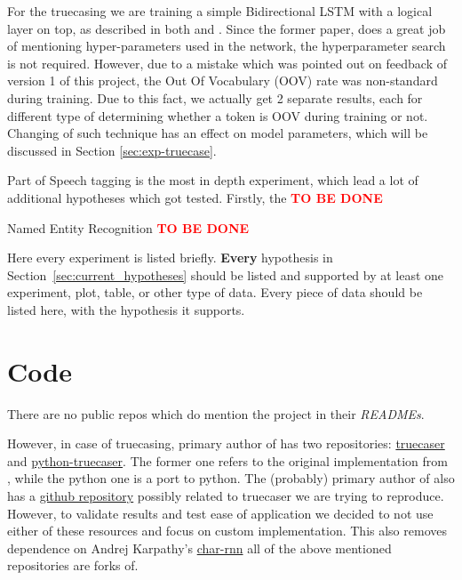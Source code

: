 \documentclass[11pt,a4paper]{article}
\begin{document}
For the truecasing we are training a simple Bidirectional LSTM with a logical layer on top, as described in both \cite{ner-and-pos-original} and \cite{susanto-etal-2016-learning}. Since the former paper, does a great job of mentioning hyper-parameters used in the network, the hyperparameter search is not required. However, due to a mistake which was pointed out on feedback of version 1 of this project, the Out Of Vocabulary (OOV) rate was non-standard during training. Due to this fact, we actually get 2 separate results, each for different type of determining whether a token is OOV during training or not. Changing of such technique has an effect on model parameters, which will be discussed in Section \ref{sec:exp-truecase}.

Part of Speech tagging is the most in depth experiment, which lead a lot of additional hypotheses which got tested. Firstly, the \textbf{\textcolor{red}{TO BE DONE}}

Named Entity Recognition \textbf{\textcolor{red}{TO BE DONE}}

Here every experiment is listed briefly.
\textbf{Every} hypothesis in Section~\ref{sec:current_hypotheses} should be listed and supported by at least one experiment, plot, table, or other type of data. 
Every piece of data should be listed here, with the hypothesis it supports.

\section{Code}
There are no public repos which do mention the project in their \textit{READMEs}.

However, in case of truecasing, primary author of \cite{ner-and-pos-original} has two repositories: \href{https://github.com/mayhewsw/truecaser}{truecaser} and \href{https://github.com/mayhewsw/pytorch-truecaser}{python-truecaser}. The former one refers to the original implementation from \cite{susanto-etal-2016-learning}, while the python one is a port to python. The (probably) primary author of \cite{susanto-etal-2016-learning} also has a \href{https://github.com/raymondhs/char-rnn-truecase}{github repository} possibly related to truecaser we are trying to reproduce. However, to validate results and test ease of application we decided to not use either of these resources and focus on custom implementation. This also removes dependence on Andrej Karpathy's \href{https://github.com/karpathy/char-rnn}{char-rnn} all of the above mentioned repositories are forks of.
\end{document}
